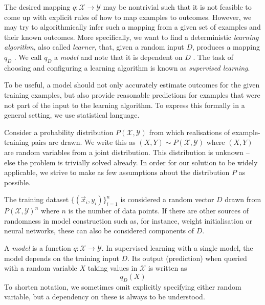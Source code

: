 \documentclass[
    a4paper, %
	fontsize=10pt, %
	twoside=false, %
]{kaobook}
\begin{document}
\begin{titlepage}
The desired mapping $q: \mathcal{X} \to \mathcal{Y}$ may be nontrivial such that it is not feasible to come up with explicit rules of how to map examples to outcomes. However, we may try to algorithmically infer such a mapping from a given set of examples and their known outcomes. More specifically, we want to find a deterministic \textit{learning algorithm}, also called \textit{learner}, that, given a random input $D$, produces a mapping $q_D$
.
We call $q_D$ a \textit{model} and note that it is dependent on $D$ .
The task of choosing and configuring a learning algorithm is known as \textit{supervised learning}.

To be useful, a model should not only accurately estimate outcomes for the given training examples, but also provide reasonable predictions for examples that were not part of the input to the learning algorithm. To express this formally in a general setting, we use statistical language.

Consider a probability distribution $P(\mathcal{X}, \mathcal{Y})$ from which realisations of example-training pairs are drawn. We write this as $(X, Y) \sim P(\mathcal{X}, \mathcal{Y})$ where $(X,Y)$ are random variables from a joint distribution.
This distribution is unknown -- else the problem is trivially solved already. In order for our solution to be widely applicable, we strive to make as few assumptions about the distribution $P$ as possible. 

The training dataset $\{ (\vec{x}_{i}, y_{i}) \}_{i=1}^n$ is considered a random vector $D$ drawn from $P(\mathcal{X}, \mathcal{Y})^n$ where $n$ is the number of data points. If there are other sources of randomness in model construction such as, for instance, weight initialisation or neural networks, these can also be considered components of $D$.

\begin{definition}
A \textit{model} is a function $q: \mathcal{X} \to \mathcal{Y}$. In supervised learning with a single model, the model depends on the training input $D$. Its output (prediction) when queried with a random variable $X$ taking values in $\mathcal{X}$ is written as
$$
q_{D}(X)
$$
To shorten notation, we sometimes omit explicitly specifying either random variable, but a dependency on these is always to be understood.
\end{definition}


\end{titlepage}
\end{document}
